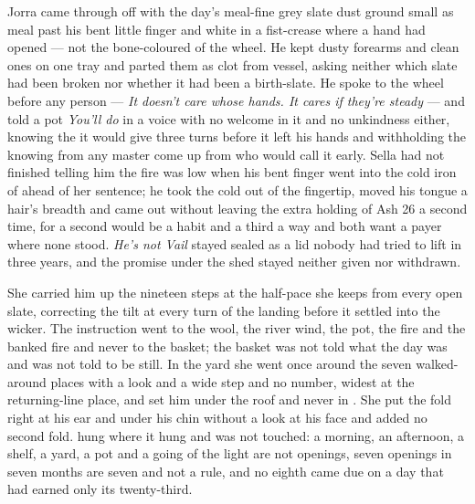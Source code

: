 Jorra came through  off  with the day's meal-fine grey slate dust ground small as meal past his bent little finger and white in a fist-crease where a hand had opened --- not the bone-coloured  of the wheel. He kept dusty forearms and clean ones on one tray and parted them as clot from vessel, asking neither which slate had been broken nor whether it had been a birth-slate. He spoke to the wheel before any person --- \emph{It doesn't care whose hands. It cares if they're steady} --- and told a pot \emph{You'll do} in a voice with no welcome in it and no unkindness either, knowing the  it would give three turns before it left his hands and withholding the knowing from any master come up from  who would call it early. Sella had not finished telling him the fire was low when his bent finger went into the cold iron of  ahead of her sentence; he took the cold out of the fingertip, moved his tongue a hair's breadth and came out without leaving the extra holding of Ash 26 a second time, for a second would be a habit and a third a way and both want a payer where none stood. \emph{He's not Vail} stayed sealed as a lid nobody had tried to lift in three years, and the promise under the shed stayed neither given nor withdrawn.

She carried him up the nineteen steps at the half-pace she keeps from every open slate, correcting the tilt at every turn of the landing before it settled into the wicker. The instruction went to the wool, the river wind, the pot, the fire and the banked fire and never to the basket; the basket was not told what the day was and was not told to be still. In the yard she went once around the seven walked-around places with a look and a wide step and no number, widest at the returning-line place, and set him under the roof and never in . She put the fold right at his ear and under his chin without a look at his face and added no second fold.  hung where it hung and was not touched: a morning, an afternoon, a shelf, a yard, a pot and a going of the light are not openings, seven openings in seven months are seven and not a rule, and no eighth came due on a day that had earned only its twenty-third.

\scenebreak

